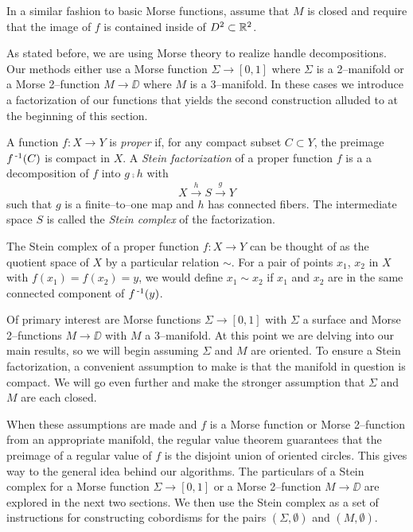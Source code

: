 In a similar fashion to basic Morse functions, assume that $M$ is closed and require that the image of $f$ is contained inside of $D^2\subset\mathbb{R}^2$.

As stated before, we are using Morse theory to realize handle decompositions.
Our methods either use a Morse function $\Sigma\to[0,1]$ where $\Sigma$ is a 2--manifold or a Morse 2--function $M\to\DD$ where $M$ is a 3--manifold.
In these cases we introduce a factorization of our functions that yields the second construction alluded to at the beginning of this section.

\begin{defn}
	\label{def:stein}
	A function $f:X\to Y$ is \emph{proper} if, for any compact subset $C\subset Y$, the preimage $f^{\,\text{-}1}(C)$ is compact in $X$.
	A \emph{Stein factorization} of a proper function $f$ is a a decomposition of $f$ into $g\comp h$ with $$X\overset{h}{\to} S \overset{g}{\to} Y$$ such that $g$ is a finite--to--one map and $h$ has connected fibers.
	The intermediate space $S$ is called the \emph{Stein complex} of the factorization.
\end{defn}

The Stein complex of a proper function $f:X\to Y$ can be thought of as the quotient space of $X$ by a particular relation $\sim$.
For a pair of points $x_1$, $x_2$ in $X$ with $f(x_1)=f(x_2)=y$, we would define $x_1\sim x_2$ if $x_1$ and $x_2$ are in the same connected component of $f^{\,\text{-}1}(y)$.

Of primary interest are Morse functions $\Sigma\to[0,1]$ with $\Sigma$ a surface and Morse 2--functions $M\to\DD$ with $M$ a 3--manifold.
At this point we are delving into our main results, so we will begin assuming $\Sigma$ and $M$ are oriented.
To ensure a Stein factorization, a convenient assumption to make is that the manifold in question is compact.
We will go even further and make the stronger assumption that $\Sigma$ and $M$ are each closed.

When these assumptions are made and $f$ is a Morse function or Morse 2--function from an appropriate manifold, the regular value theorem guarantees that the preimage of a regular value of $f$ is the disjoint union of oriented circles.
This gives way to the general idea behind our algorithms.
The particulars of a Stein complex for a Morse function $\Sigma\to[0,1]$ or a Morse 2--function $M\to\DD$ are explored in the next two sections.
We then use the Stein complex as a set of instructions for constructing cobordisms for the pairs $(\Sigma,\emptyset)$ and $(M,\emptyset)$.
